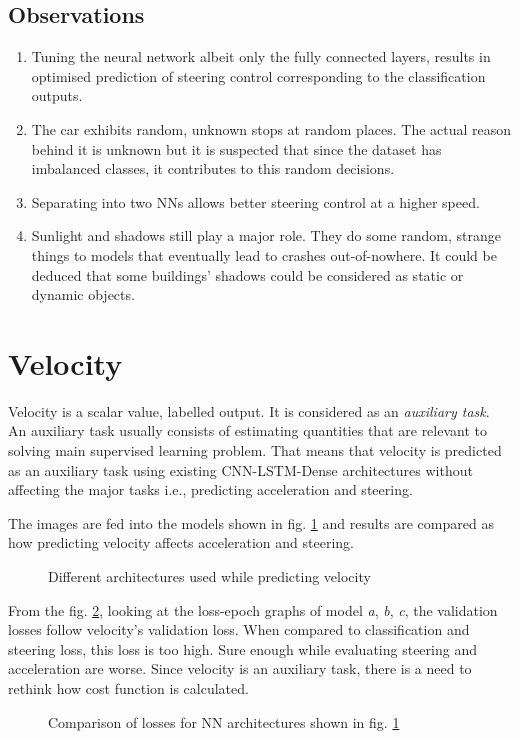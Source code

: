 \subsection{Observations}
\begin{enumerate}
    \item Tuning the neural network albeit only the fully connected layers, results in
        optimised prediction of steering control corresponding to the classification
        outputs.
    \item The car exhibits random, unknown stops at random places. The actual reason
        behind it is unknown but it is suspected that since the dataset has imbalanced
        classes, it contributes to this random decisions.
    \item Separating into two NNs allows better steering control at a higher speed.
    \item Sunlight and shadows still play a major role. They do some random, strange
        things to models that eventually lead to crashes out-of-nowhere. It could be
        deduced that some buildings' shadows could be considered as static or dynamic
        objects.
\end{enumerate}
\section{Velocity}
Velocity is a scalar value, labelled output. It is considered as an \textit{auxiliary
task}. An auxiliary task usually consists of estimating quantities that are relevant to
solving main supervised learning problem. That means that velocity is predicted as an
auxiliary task using existing CNN-LSTM-Dense architectures without affecting the major
tasks i.e., predicting acceleration and steering.

The images are fed into the models shown in fig. \ref{fig:velocitycompareNN} and results are
compared as how predicting velocity affects acceleration and steering.
\begin{figure}[!ht]
    \centering
    \def\svgwidth{\textwidth}
    \caption{Different architectures used while predicting velocity}
    \label{fig:velocitycompareNN}
\end{figure}

From the fig. \ref{fig:velocitycompareloss1}, looking at the loss-epoch graphs of model
\textit{a}, \textit{b}, \textit{c}, the validation losses follow velocity's validation loss.
When compared to classification and steering loss, this loss is too high. Sure enough
while evaluating steering and acceleration are worse. Since velocity is an auxiliary task,
there is a need to rethink how cost function is calculated.
\begin{figure}[!ht]
	\centering
    \def\svgwidth{\textwidth}
    \caption{Comparison of losses for NN architectures shown in fig. \ref{fig:velocitycompareNN}}
    \label{fig:velocitycompareloss1}
\end{figure}

